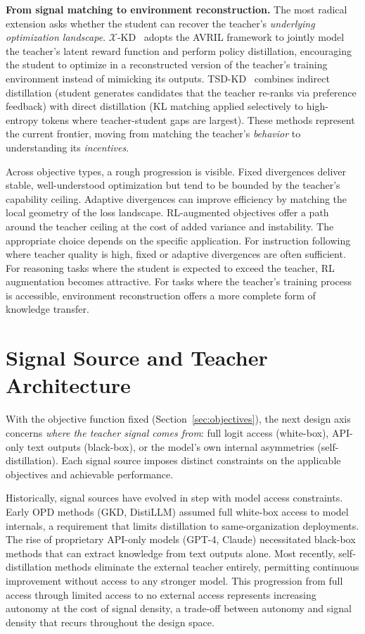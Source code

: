 \documentclass{article} %
\begin{document}
\textbf{From signal matching to environment reconstruction.} The most radical extension asks whether the student can recover the teacher's \emph{underlying optimization landscape}. $\mathcal{X}$-KD~\citep{2602.12674} adopts the AVRIL framework to jointly model the teacher's latent reward function and perform policy distillation, encouraging the student to optimize in a reconstructed version of the teacher's training environment instead of mimicking its outputs. TSD-KD~\citep{2603.13260} combines indirect distillation (student generates candidates that the teacher re-ranks via preference feedback) with direct distillation (KL matching applied selectively to high-entropy tokens where teacher-student gaps are largest). These methods represent the current frontier, moving from matching the teacher's \emph{behavior} to understanding its \emph{incentives}.

Across objective types, a rough progression is visible. Fixed divergences deliver stable, well-understood optimization but tend to be bounded by the teacher's capability ceiling. Adaptive divergences can improve efficiency by matching the local geometry of the loss landscape. RL-augmented objectives offer a path around the teacher ceiling at the cost of added variance and instability. The appropriate choice depends on the specific application. For instruction following where teacher quality is high, fixed or adaptive divergences are often sufficient. For reasoning tasks where the student is expected to exceed the teacher, RL augmentation becomes attractive. For tasks where the teacher's training process is accessible, environment reconstruction offers a more complete form of knowledge transfer.

\section{Signal Source and Teacher Architecture}
\label{sec:signal}

With the objective function fixed (Section~\ref{sec:objectives}), the next design axis concerns \emph{where the teacher signal comes from}: full logit access (white-box), API-only text outputs (black-box), or the model's own internal asymmetries (self-distillation). Each signal source imposes distinct constraints on the applicable objectives and achievable performance.

Historically, signal sources have evolved in step with model access constraints. Early OPD methods (GKD, DistiLLM) assumed full white-box access to model internals, a requirement that limits distillation to same-organization deployments. The rise of proprietary API-only models (GPT-4, Claude) necessitated black-box methods that can extract knowledge from text outputs alone. Most recently, self-distillation methods eliminate the external teacher entirely, permitting continuous improvement without access to any stronger model. This progression from full access through limited access to no external access represents increasing autonomy at the cost of signal density, a trade-off between autonomy and signal density that recurs throughout the design space.
\end{document}
